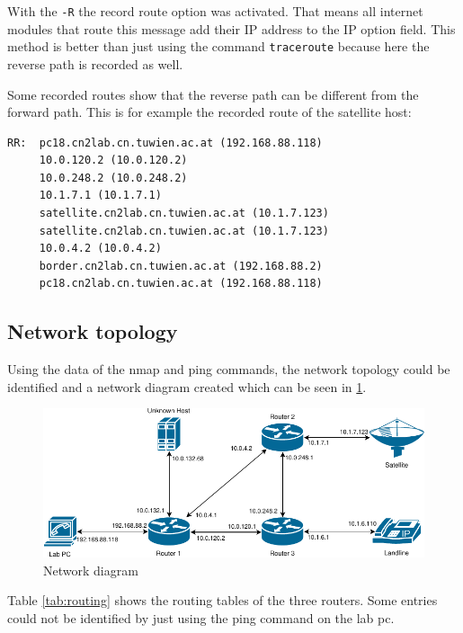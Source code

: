 \documentclass[parskip=full]{scrartcl}
\begin{document}
With the \verb|-R| the record route option was activated.
That means all internet modules that route this message add their IP address to the IP option field.
This method is better than just using the command \verb|traceroute| because here the reverse path is recorded as well.

Some recorded routes show that the reverse path can be different from the forward path. 
This is for example the recorded route of the satellite host:
\begin{verbatim}
RR:  pc18.cn2lab.cn.tuwien.ac.at (192.168.88.118)
     10.0.120.2 (10.0.120.2)
     10.0.248.2 (10.0.248.2)
     10.1.7.1 (10.1.7.1)
     satellite.cn2lab.cn.tuwien.ac.at (10.1.7.123)
     satellite.cn2lab.cn.tuwien.ac.at (10.1.7.123)
     10.0.4.2 (10.0.4.2)
     border.cn2lab.cn.tuwien.ac.at (192.168.88.2)
     pc18.cn2lab.cn.tuwien.ac.at (192.168.88.118)
\end{verbatim}

\subsection{Network topology}
Using the data of the nmap and ping commands, the network topology could be identified and a network diagram created which can be seen in \cref{fig:topology}.
\begin{figure}[!ht]
	\centering %
	\includegraphics[width=\textwidth]{images/topology.pdf} %
	\caption{Network diagram} 
	\label{fig:topology} %
\end{figure}
Table \ref{tab:routing} shows the routing tables of the three routers. 
Some entries could not be identified by just using the ping command on the lab pc.
\end{document}
